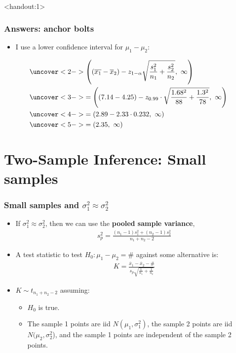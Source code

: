 \documentclass[handout]{beamer}\usepackage{graphicx, color}
\newcommand{\answers}{1}
\providecommand{\ov}[1]{\overline{#1}}
\numberwithin{equation}{section}
\begin{document}
\begin{frame}<handout:\answers>
\frametitle{Answers: anchor bolts}
\begin{itemize}
\item I use a lower confidence interval for $\mu_1 - \mu_2$:
\end{itemize}
\begin{align*}
&\uncover<2->{\left ((\ov{x_1} - \ov{x}_2) - z_{1 - \alpha} \sqrt{\frac{s^2_1}{n_1} + \frac{s^2_2}{n_2}}, \ \infty \right )}  \\
&\uncover<3->{= \left ((7.14 - 4.25) - z_{0.99} \cdot \sqrt{\frac{1.68^2}{88} + \frac{1.3^2}{78}}, \ \infty \right )} \\ 
&\uncover<4->{= (2.89 - 2.33 \cdot 0.232, \ \infty )} \\
&\uncover<5->{= (2.35, \ \infty)}
\end{align*}
\begin{itemize}
\end{itemize}
\end{frame}

















\section{Two-Sample Inference: Small samples}

\begin{frame}
\frametitle{Small samples and $\sigma^2_1 \approx \sigma^2_2$}
\begin{itemize}
\item If $\sigma^2_1 \approx \sigma^2_2$, then we can use the {\bf pooled sample variance},
\pause \begin{align*}
s^2_p = \frac{(n_1 - 1) s_1^2 + (n_2 - 1) s_2^2}{n_1 + n_2 - 2}
\end{align*}
\pause \item A test statistic to test $H_0: \mu_1 - \mu_2 = \#$ against some alternative is:
\pause \begin{align*}
K = \frac{\ov{x}_1 - \ov{x}_2 - \#}{s_p \sqrt{\frac{1}{n_1} + \frac{1}{n_2}}}
\end{align*}
\pause \item $K \sim t_{n_1 + n_2 -2}$ assuming:
\begin{itemize}
\pause \item $H_0$ is true.
\pause \item The sample 1 points are iid $N(\mu_1, \sigma_1^2)$, the sample 2 points are iid $N(\mu_2, \sigma_2^2$), and the sample 1 points are independent of the sample 2 points.
\end{itemize}
\end{itemize}
\end{frame}
\end{document}
